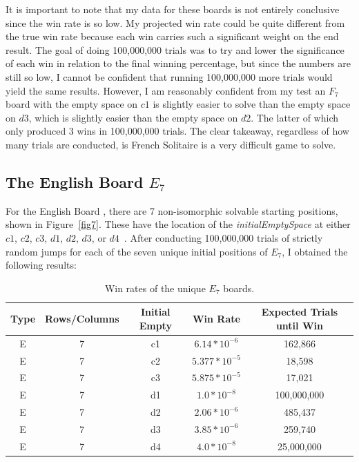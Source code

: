 \documentclass{article}
\begin{document}
It is important to note that my data for these boards is not entirely conclusive since the win rate is so low. My projected win rate could be quite different from the true win rate because each win carries such a significant weight on the end result. The goal of doing 100,000,000 trials was to try and lower the significance of each win in relation to the final winning percentage, but since the numbers are still so low, I cannot be confident that running 100,000,000 more trials would yield the same results. However, I am reasonably confident from my test an $F_7$ board with the empty space on $c1$ is slightly easier to solve than the empty space on $d3$, which is slightly easier than the empty space on $d2$. The latter of which only produced 3 wins in 100,000,000 trials. The clear takeaway, regardless of how many trials are conducted, is French Solitaire is a very difficult game to solve.


\subsection{The English Board $E_7$}
\label{3.2EnglishE7}
For the English Board , there are 7 non-isomorphic solvable starting positions, shown in Figure~\ref{fig7}. These have the location of the \textit{initialEmptySpace} at either $c1$, $c2$, $c3$, $d1$, $d2$, $d3$, or $d4$~\cite{Beasley}. After conducting 100,000,000 trials of strictly random jumps for each of the seven unique initial positions of $E_7$, I obtained the following results:



\begin{table}[htb]
\begin{center} 
\begin{tabularx}{.88\textwidth}{ c  c  c  c  c }
\hline
\textbf{Type} & \textbf{Rows/Columns} &\textbf{Initial Empty} & \textbf{Win Rate} & \textbf{Expected Trials until Win}\\
\hline
E & 7 & c1 & $6.14*10^{-6}$ & 162,866\\

E & 7 & c2 & $5.377*10^{-5}$ & 18,598\\

E & 7 & c3 & $5.875*10^{-5}$ & 17,021\\

E & 7 & d1 & $1.0*10^{-8}$ & 100,000,000\\

E & 7 & d2 & $2.06*10^{-6}$& 485,437\\

E & 7 & d3 & $3.85*10^{-6}$ & 259,740\\

E & 7 & d4 & $4.0*10^{-8}$ & 25,000,000\\
\end{tabularx}
\caption{Win rates of the unique $E_7$ boards.}
\label{tab2}
\end{center} 
\end{table}
\end{document}
